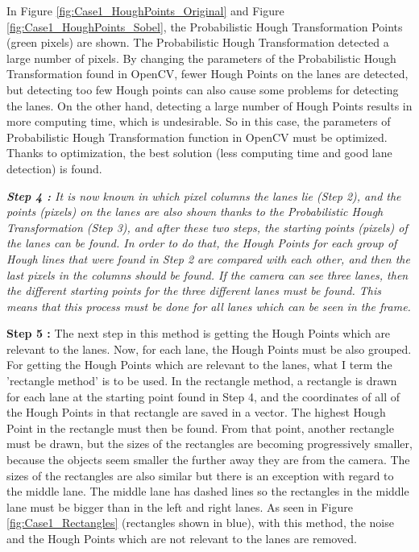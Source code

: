 In Figure \ref{fig:Case1_HoughPoints_Original} and Figure \ref{fig:Case1_HoughPoints_Sobel}, the Probabilistic Hough Transformation Points (green pixels) are shown. The Probabilistic Hough Transformation detected a large number of pixels. By changing the parameters of the Probabilistic Hough Transformation found in OpenCV, fewer Hough Points on the lanes are detected, but detecting too few Hough points can also cause some problems for detecting the lanes. On the other hand, detecting a large number of Hough Points results in more computing time, which is undesirable. So in this case, the parameters of Probabilistic Hough Transformation function in OpenCV must be optimized. Thanks to optimization, the best solution (less computing time and good lane detection) is found.

\emph{\color{green}\textbf{Step 4 : }It is now known in which pixel columns the lanes lie (Step 2), and the points (pixels) \emph{\color{green}on the lanes are also shown thanks} to the Probabilistic Hough Transformation (Step 3), and after these two steps, the starting points (pixels) of the lanes can be found. In order to do that, the Hough Points for each group of Hough lines that were found in Step 2 are compared with each other, and then the last pixels in the columns should be found. If the camera can see three lanes, then the different starting points for the three different lanes must be found. This means that this process must be done for all lanes which can be seen in the frame.}


\textbf{Step 5 : }The next step in this method is getting the Hough Points which are relevant to the lanes. Now, for each lane, the Hough Points must be also grouped. For getting the Hough Points which are relevant to the lanes, what I term the 'rectangle method' is to be used. In the rectangle method, a rectangle is drawn for each lane at the starting point found in Step 4, and the coordinates of all of the Hough Points in that rectangle are saved in a vector. The highest Hough Point in the rectangle must then be found. From that point, another rectangle must be drawn, but the sizes of the rectangles are becoming progressively smaller, because the objects seem smaller the further away they are from the camera. The sizes of the rectangles are also similar but there is an exception with regard to the middle lane. The middle lane has dashed lines so the rectangles in the middle lane must be bigger than in the left and right lanes. As seen in Figure \ref{fig:Case1_Rectangles} (rectangles shown in blue), with this method, the noise and the Hough Points which are not relevant to the lanes are removed.


